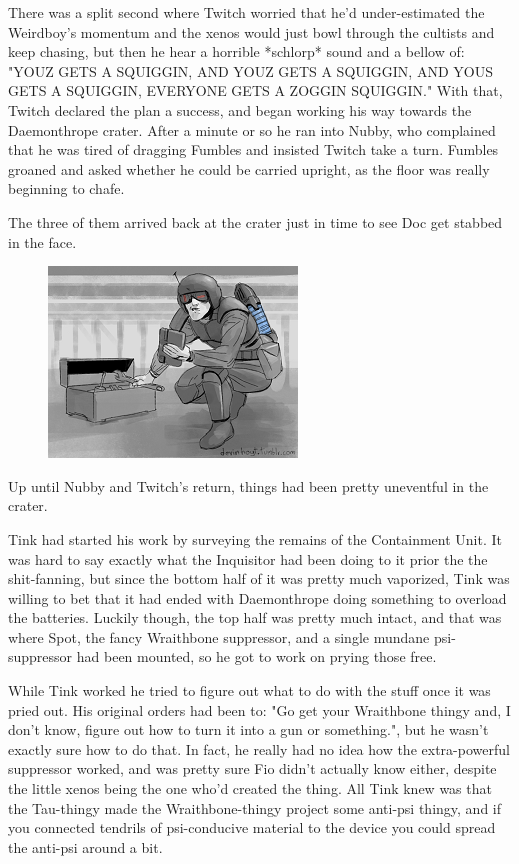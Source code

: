 There was a split second where Twitch worried that he'd under-estimated the Weirdboy's momentum and the xenos would just bowl through the cultists and keep chasing, but then he hear a horrible *schlorp* sound and a bellow of: 
"YOUZ GETS A SQUIGGIN, AND YOUZ GETS A SQUIGGIN, AND YOUS GETS A SQUIGGIN, EVERYONE GETS A ZOGGIN SQUIGGIN." With that, Twitch declared the plan a success, and began working his way towards the Daemonthrope crater. 
After a minute or so he ran into Nubby, who complained that he was tired of dragging Fumbles and insisted Twitch take a turn. 
Fumbles groaned and asked whether he could be carried upright, as the floor was really beginning to chafe.

The three of them arrived back at the crater just in time to see Doc get stabbed in the face.
\begin{figure}
	\begin{center}
		\includegraphics[width=\figwidth]{pics/16/35.png}
	\end{center}
\end{figure}
Up until Nubby and Twitch's return, things had been pretty uneventful in the crater. 


Tink had started his work by surveying the remains of the Containment Unit. 
It was hard to say exactly what the Inquisitor had been doing to it prior the the shit-fanning, but since the bottom half of it was pretty much vaporized, Tink was willing to bet that it had ended with Daemonthrope doing something to overload the batteries. 
Luckily though, the top half was pretty much intact, and that was where Spot, the fancy Wraithbone suppressor, and a single mundane psi-suppressor had been mounted, so he got to work on prying those free.

While Tink worked he tried to figure out what to do with the stuff once it was pried out. 
His original orders had been to: 
"Go get your Wraithbone thingy and, I don't know, figure out how to turn it into a gun or something.", but he wasn't exactly sure how to do that. 
In fact, he really had no idea how the extra-powerful suppressor worked, and was pretty sure Fio didn't actually know either, despite the little xenos being the one who'd created the thing. 
All Tink knew was that the Tau-thingy made the Wraithbone-thingy project some anti-psi thingy, and if you connected tendrils of psi-conducive material to the device you could spread the anti-psi around a bit.

